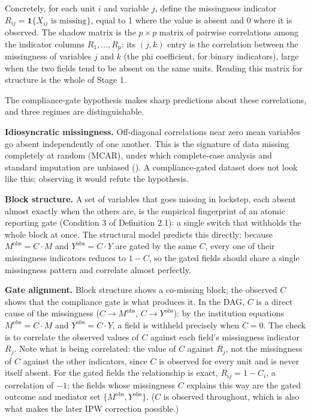 Concretely, for each unit $i$ and variable $j$, define the missingness indicator $R_{ij} = \mathbf{1}\{X_{ij} \text{ is missing}\}$, equal to 1 where the value is absent and 0 where it is observed. The shadow matrix is the $p \times p$ matrix of pairwise correlations among the indicator columns $R_1, \ldots, R_p$: its $(j, k)$ entry is the correlation between the missingness of variables $j$ and $k$ (the phi coefficient, for binary indicators), large when the two fields tend to be absent on the same units. Reading this matrix for structure is the whole of Stage 1.

The compliance-gate hypothesis makes sharp predictions about these correlations, and three regimes are distinguishable.

\textbf{Idiosyncratic missingness.} Off-diagonal correlations near zero mean variables go absent independently of one another. This is the signature of data missing completely at random (MCAR), under which complete-case analysis and standard imputation are unbiased (). A compliance-gated dataset does not look like this; observing it would refute the hypothesis.

\textbf{Block structure.} A set of variables that goes missing in lockstep, each absent almost exactly when the others are, is the empirical fingerprint of an atomic reporting gate (Condition 3 of Definition 2.1): a single switch that withholds the whole block at once. The structural model predicts this directly: because $M^{\text{obs}} = C \cdot M$ and $Y^{\text{obs}} = C \cdot Y$ are gated by the same $C$, every one of their missingness indicators reduces to $1 - C$, so the gated fields should share a single missingness pattern and correlate almost perfectly.

\textbf{Gate alignment.} Block structure shows a co-missing block; the observed $C$ shows that the compliance gate is what produces it. In the DAG, $C$ is a direct cause of the missingness ($C \to M^{\text{obs}}$, $C \to Y^{\text{obs}}$): by the institution equations $M^{\text{obs}} = C \cdot M$ and $Y^{\text{obs}} = C \cdot Y$, a field is withheld precisely when $C = 0$. The check is to correlate the observed values of $C$ against each field's missingness indicator $R_j$. Note what is being correlated: the value of $C$ against $R_j$, not the missingness of $C$ against the other indicators, since $C$ is observed for every unit and is never itself absent. For the gated fields the relationship is exact, $R_{ij} = 1 - C_i$, a correlation of $-1$; the fields whose missingness $C$ explains this way are the gated outcome and mediator set $\{M^{\text{obs}}, Y^{\text{obs}}\}$. ($C$ is observed throughout, which is also what makes the later IPW correction possible.)

